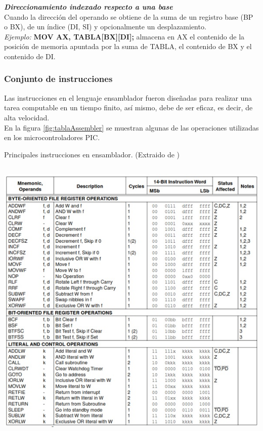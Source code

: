 \documentclass[12pt,a4paper]{article}
\begin{document}
   \textbf{\textit{Direccionamiento indexado respecto a una base}}\\
  Cuando la dirección del operando se obtiene de la suma de un registro base (BP o BX), de un índice (DI, SI) y opcionalmente un desplazamiento. \\
   \textit{Ejemplo:}
   \hspace{1cm} \textbf{MOV AX, TABLA[BX][DI];} almacena en AX el contenido de la posición de memoria apuntada por la suma de TABLA, el contenido de BX y el contenido de DI. \\   
   
   \subsubsection{Conjunto de instrucciones}
   Las instrucciones en el lenguaje ensamblador fueron diseñadas para realizar una tarea computable en un tiempo finito, así mismo, debe de ser eficaz, es decir, de alta velocidad.\\
  En la figura \ref{fig:tablaAssembler} se muestran algunas de las operaciones utilizadas en los microcontroladores PIC.
   
   \begin{table}[htpb]
    \centering
    \caption{Principales instrucciones en ensamblador. (Extraido de \cite{PIC})}
     \includegraphics[height=14cm]{InstruccionesEnsamblador}
     
     \label{fig:tablaAssembler}
   \end{table}
   
\end{document}
